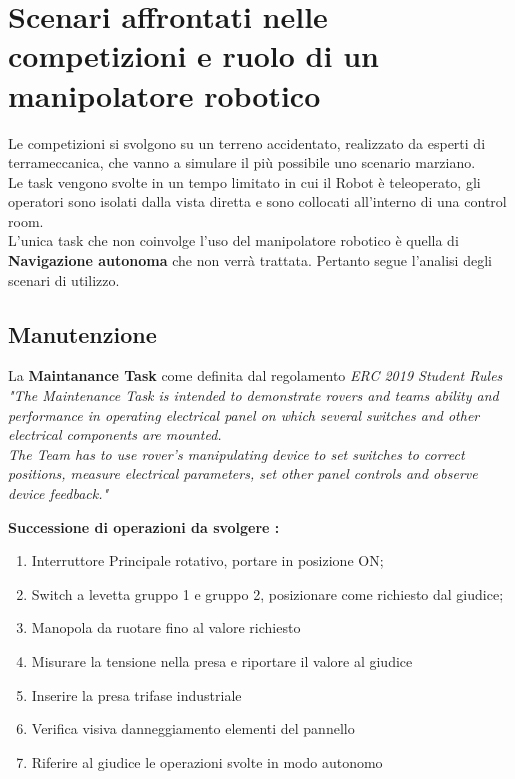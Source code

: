 \documentclass[%
corpo=11pt,
twoside,
 stile=classica,
oldstyle,
greek,%
]{toptesi}
\begin{document}
	\section{Scenari affrontati nelle competizioni e ruolo di un manipolatore robotico}
		Le competizioni si svolgono su un terreno accidentato, realizzato da esperti di terrameccanica, che vanno a simulare il più possibile uno scenario marziano. \\
		Le task vengono svolte in un tempo limitato in cui il Robot è teleoperato, gli operatori sono isolati dalla vista diretta e sono collocati all'interno di una control room. \\
		
		L'unica task che non coinvolge l'uso del manipolatore robotico è quella di \textbf{Navigazione autonoma} che non verrà trattata. 
		Pertanto segue l'analisi degli scenari di utilizzo. 
		\subsection{Manutenzione}
		La  \textbf{Maintanance Task} come definita dal regolamento 
		\textit{ERC 2019 Student Rules} \cite{ERC2019} 
		\newline
		\textit{"The Maintenance Task is intended to demonstrate rovers and teams ability and performance in operating electrical panel on which several switches and other electrical components are mounted. \\
		The Team has to use rover’s manipulating device to set switches to correct positions, measure electrical parameters, set other panel controls and observe device feedback."}

		\newline
		\textbf{Successione di operazioni da svolgere :}
		\begin{enumerate}
		\item Interruttore Principale rotativo, portare in posizione ON;
		\item Switch a levetta gruppo 1 e gruppo 2, posizionare come richiesto dal giudice;
		\item Manopola da ruotare fino al valore richiesto
		\item Misurare la tensione nella presa e riportare il valore al giudice
		\item Inserire la presa trifase industriale
		\item Verifica visiva danneggiamento elementi del pannello 
		\item Riferire al giudice le operazioni svolte in modo autonomo	 
		\end{enumerate}
	
\end{document}
